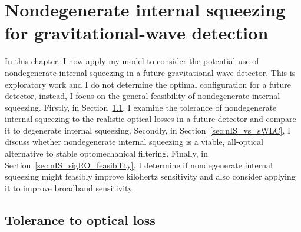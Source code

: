 \chapter{Nondegenerate internal squeezing for gravitational-wave detection}
\label{chp:science_case}


In this chapter, I now apply my model to consider the potential use of nondegenerate internal squeezing in a future gravitational-wave detector. This is exploratory work and I do not determine the optimal configuration for a future detector, instead, I focus on the general feasibility of nondegenerate internal squeezing. %
Firstly, in Section~\ref{sec:nIS_tolerance_to_losses}, I examine the tolerance of nondegenerate internal squeezing to the realistic optical losses in a future detector and compare it to degenerate internal squeezing. Secondly, in Section~\ref{sec:nIS_vs_sWLC}, I discuss whether nondegenerate internal squeezing is a viable, all-optical alternative to stable optomechanical filtering. Finally, in Section~\ref{sec:nIS_sigRO_feasibility}, I determine if nondegenerate internal squeezing might feasibly improve kilohertz sensitivity and also consider applying it to improve broadband sensitivity. %

\section{Tolerance to optical loss}
\label{sec:nIS_tolerance_to_losses}

